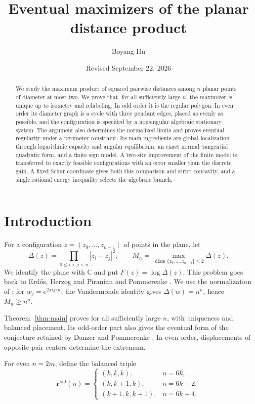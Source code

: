 \documentclass[11pt,reqno]{amsart}
\title[Eventual distance-product maximizers]{Eventual maximizers of the planar distance product}
\author{Boyang Hu}
\date{Revised September 22, 2026}
\numberwithin{equation}{section}
\theoremstyle{definition}
\theoremstyle{remark}
\newcommand{\C}{\mathbb C}
\newcommand{\bal}{\mathrm{bal}}
\DeclareMathOperator{\diam}{diam}
\begin{document}
\begin{abstract}
We study the maximum product of squared pairwise distances among $n$ planar points of diameter at most two. We prove that, for all sufficiently large $n$, the maximizer is unique up to isometry and relabeling. In odd order it is the regular polygon. In even order its diameter graph is a cycle with three pendant edges, placed as evenly as possible, and the configuration is specified by a nonsingular algebraic stationary system. The argument also determines the normalized limits and proves eventual regularity under a perimeter constraint. Its main ingredients are global localization through logarithmic capacity and angular equilibrium, an exact normal--tangential quadratic form, and a finite sign model. A two-site improvement of the finite model is transferred to exactly feasible configurations with an error smaller than the discrete gain. A fixed Schur coordinate gives both this comparison and strict concavity, and a single rational energy inequality selects the algebraic branch.
\end{abstract}
\maketitle
\section{Introduction}\label{sec:intro}
For a configuration $z=(z_0,\ldots,z_{n-1})$ of points in the plane, let
\begin{equation}\label{eq:problem}
 \Delta(z)=\prod_{0\le i<j<n}|z_i-z_j|^2,
 \qquad M_n=\max_{\diam\{z_0,\ldots,z_{n-1}\}\le2}\Delta(z).
\end{equation}
We identify the plane with $\C$ and put $F(z)=\log\Delta(z)$. This problem goes back to Erd\H{o}s, Herzog and Piranian \cite[Problem~13, p.~143]{ehp} and Pommerenke \cite{pommerenke}. We use the normalization of \cite{cambie}; for $w_j=e^{2\pi ij/n}$, the Vandermonde identity gives $\Delta(w)=n^n$, hence $M_n\ge n^n$.

Theorem~\ref{thm:main} proves \cite[Conjecture~4]{cambie} for all sufficiently large $n$, with uniqueness and balanced placement. Its odd-order part also gives the eventual form of the conjecture retained by Danzer and Pommerenke \cite[p.~102]{danzer-pommerenke}. In even order, displacements of opposite-pair centers determine the extremum.

For even $n=2m$, define the balanced triple
\begin{equation}\label{eq:balanced}
 \mathbf r^{\bal}(n)=
 \begin{cases}
 (k,k,k),&n=6k,\\
 (k,k+1,k),&n=6k+2,\\
 (k+1,k,k+1),&n=6k+4.
 \end{cases}
\end{equation}
\end{document}
